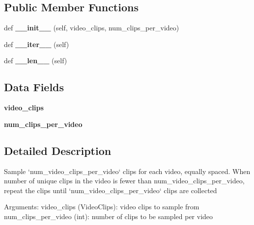\subsection*{Public Member Functions}
\begin{DoxyCompactItemize}
\item 
\mbox{\label{classtorchvision_1_1datasets_1_1samplers_1_1clip__sampler_1_1UniformClipSampler_ab515dec8f06a95aff1eb6c47e0ce59e9}} 
def {\bfseries \+\_\+\+\_\+init\+\_\+\+\_\+} (self, video\+\_\+clips, num\+\_\+clips\+\_\+per\+\_\+video)
\item 
\mbox{\label{classtorchvision_1_1datasets_1_1samplers_1_1clip__sampler_1_1UniformClipSampler_abc9ea7ed354f414b59b5b97d65be9c81}} 
def {\bfseries \+\_\+\+\_\+iter\+\_\+\+\_\+} (self)
\item 
\mbox{\label{classtorchvision_1_1datasets_1_1samplers_1_1clip__sampler_1_1UniformClipSampler_a9ab94e95a5c8734b945497994f20be72}} 
def {\bfseries \+\_\+\+\_\+len\+\_\+\+\_\+} (self)
\end{DoxyCompactItemize}
\subsection*{Data Fields}
\begin{DoxyCompactItemize}
\item 
\mbox{\label{classtorchvision_1_1datasets_1_1samplers_1_1clip__sampler_1_1UniformClipSampler_ae9b40038b11a25cfce820ca091712bde}} 
{\bfseries video\+\_\+clips}
\item 
\mbox{\label{classtorchvision_1_1datasets_1_1samplers_1_1clip__sampler_1_1UniformClipSampler_aac597cbcc6371123d4ccd8fd45726c1f}} 
{\bfseries num\+\_\+clips\+\_\+per\+\_\+video}
\end{DoxyCompactItemize}


\subsection{Detailed Description}
\begin{DoxyVerb}Sample `num_video_clips_per_video` clips for each video, equally spaced.
When number of unique clips in the video is fewer than num_video_clips_per_video,
repeat the clips until `num_video_clips_per_video` clips are collected

Arguments:
    video_clips (VideoClips): video clips to sample from
    num_clips_per_video (int): number of clips to be sampled per video
\end{DoxyVerb}
 

